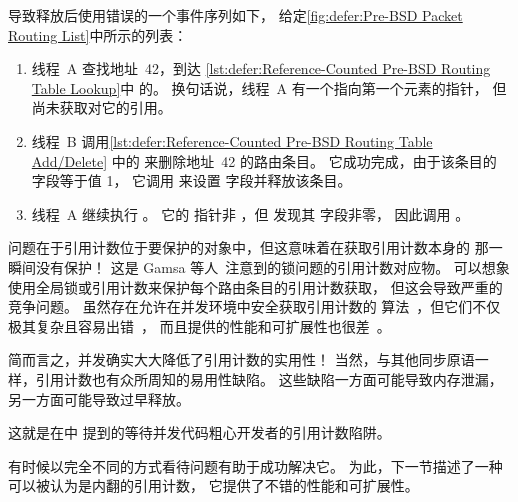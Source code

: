 导致释放后使用错误的一个事件序列如下，
给定\cref{fig:defer:Pre-BSD Packet Routing List}中所示的列表：

\begin{fcvref}
\begin{enumerate}
\item	线程~A 查找地址~42，到达
	\cref{lst:defer:Reference-Counted Pre-BSD Routing Table Lookup}中
	 的。
	换句话说，线程~A 有一个指向第一个元素的指针，
	但尚未获取对它的引用。
\item	线程~B 调用\cref{lst:defer:Reference-Counted Pre-BSD Routing Table Add/Delete}
	中的  来删除地址~42 的路由条目。
	它成功完成，由于该条目的  字段等于值 1，
	它调用  来设置  字段并释放该条目。
\item	线程~A 继续执行 。
	它的  指针非 ，但
	发现其  字段非零，
	因此调用 。
\end{enumerate}
\end{fcvref}

问题在于引用计数位于要保护的对象中，但这意味着在获取引用计数本身的
那一瞬间没有保护！
这是 Gamsa 等人~\cite{Gamsa99}注意到的锁问题的引用计数对应物。
可以想象使用全局锁或引用计数来保护每个路由条目的引用计数获取，
但这会导致严重的竞争问题。
虽然存在允许在并发环境中安全获取引用计数的
算法~\cite{Valois95a}，但它们不仅极其复杂且容易出错~\cite{MagedMichael95a}，
而且提供的性能和可扩展性也很差~\cite{ThomasEHart2007a}。

简而言之，并发确实大大降低了引用计数的实用性！
当然，与其他同步原语一样，引用计数也有众所周知的易用性缺陷。
这些缺陷一方面可能导致内存泄漏，另一方面可能导致过早释放。

这就是在中
提到的等待并发代码粗心开发者的引用计数陷阱。

\QuickQuizEnd

有时候以完全不同的方式看待问题有助于成功解决它。
为此，下一节描述了一种可以被认为是内翻的引用计数，
它提供了不错的性能和可扩展性。
